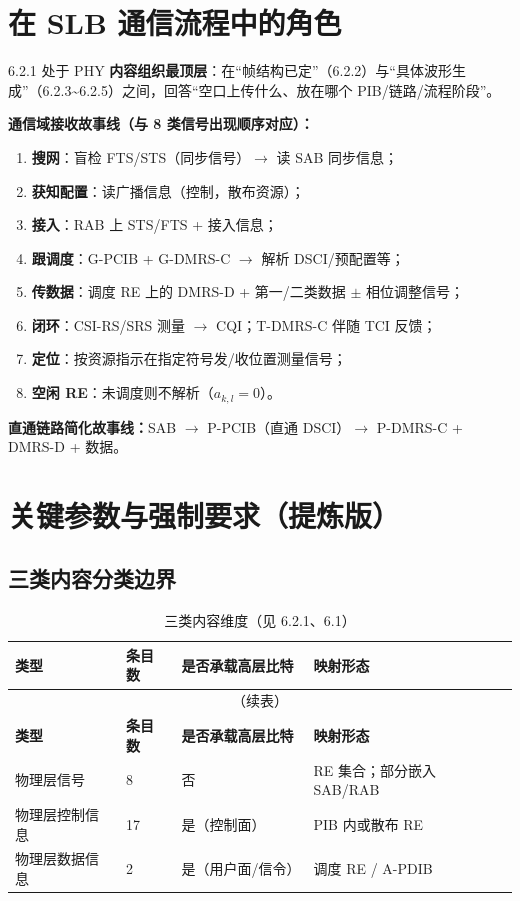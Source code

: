 \documentclass[11pt,a4paper]{ctexart}
\begin{document}
\section{在 SLB 通信流程中的角色}

6.2.1 处于 PHY \textbf{内容组织最顶层}：在``帧结构已定''（6.2.2）与``具体波形生成''（6.2.3\textasciitilde 6.2.5）之间，回答``空口上传什么、放在哪个 PIB/链路/流程阶段''。

\textbf{通信域接收故事线（与 8 类信号出现顺序对应）：}
\begin{enumerate}[nosep]
  \item \textbf{搜网}：盲检 FTS/STS（同步信号）$\rightarrow$ 读 SAB 同步信息；
  \item \textbf{获知配置}：读广播信息（控制，散布资源）；
  \item \textbf{接入}：RAB 上 STS/FTS + 接入信息；
  \item \textbf{跟调度}：G-PCIB + G-DMRS-C $\rightarrow$ 解析 DSCI/预配置等；
  \item \textbf{传数据}：调度 RE 上的 DMRS-D + 第一/二类数据 $\pm$ 相位调整信号；
  \item \textbf{闭环}：CSI-RS/SRS 测量 $\rightarrow$ CQI；T-DMRS-C 伴随 TCI 反馈；
  \item \textbf{定位}：按资源指示在指定符号发/收位置测量信号；
  \item \textbf{空闲 RE}：未调度则不解析（$a_{k,l}{=}0$）。
\end{enumerate}

\textbf{直通链路简化故事线：}SAB $\rightarrow$ P-PCIB（直通 DSCI）$\rightarrow$ P-DMRS-C + DMRS-D + 数据。

\section{关键参数与强制要求（提炼版）}

\subsection{三类内容分类边界}

\begin{longtable}{llll}
\caption{三类内容维度（见 6.2.1、6.1）} \\
\toprule
\textbf{类型} & \textbf{条目数} & \textbf{是否承载高层比特} & \textbf{映射形态} \\
\midrule
\endfirsthead
\multicolumn{4}{c}{\small（续表）} \\
\toprule
\textbf{类型} & \textbf{条目数} & \textbf{是否承载高层比特} & \textbf{映射形态} \\
\midrule
\endhead
\bottomrule
\endfoot
物理层信号 & 8 & 否 & RE 集合；部分嵌入 SAB/RAB \\
物理层控制信息 & 17 & 是（控制面） & PIB 内或散布 RE \\
物理层数据信息 & 2 & 是（用户面/信令） & 调度 RE / A-PDIB \\
\end{longtable}
\end{document}
